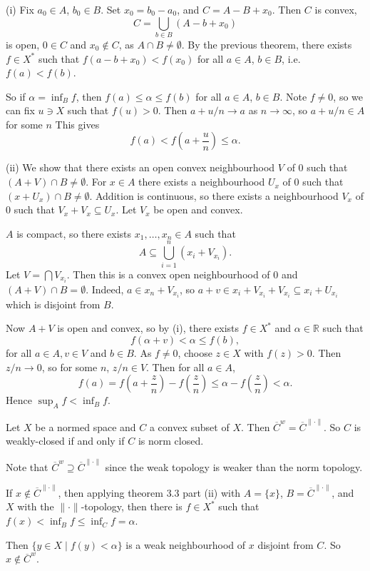 \documentclass[12pt]{article}
\begin{document}
\begin{proofbox}
	

	(i) Fix $a_0 \in A$, $b_0 \in B$. Set $x_0 = b_0 - a_0$, and $C = A - B + x_0$. Then $C$ is convex,
	\[
	C = \bigcup_{b \in B}(A - b + x_0)
	\]
	is open, $0 \in C$ and $x_0 \not \in C$, as $A \cap B \neq \emptyset$. By the previous theorem, there exists $f \in X^{\ast}$ such that $f(a - b + x_0) < f(x_0)$ for all $a \in A$, $b \in B$, i.e. $f(a) < f(b)$.

	So if $\alpha = \inf_B f$, then $f(a) \leq \alpha \leq f(b)$ for all $a \in A$, $b \in B$. Note $f \neq 0$, so we can fix $u \ni X$ such that $f(u) > 0$. Then $a + u/n \to a$ as $n \to \infty$, so $a + u/n \in A$ for some $n$ This gives
	\[
	f(a) < f\left(a + \frac{u}{n} \right) \leq \alpha.
	\]

	(ii) We show that there exists an open convex neighbourhood $V$ of $0$ such that $(A + V) \cap B \neq \emptyset$. For $x \in A$ there exists a neighbourhood $U_x$ of $0$ such that $(x + U_x) \cap B \neq \emptyset$. Addition is continuous, so there exists a neighbourhood $V_x$ of $0$ such that $V_x + V_x \subseteq U_x$. Let $V_x$ be open and convex.

	$A$ is compact, so there exists $x_1, \ldots, x_n \in A$ such that
	\[
	A \subseteq \bigcup_{i = 1}^{n}(x_i + V_{x_i}).
	\]
	Let $V = \bigcap V_{x_i}$. Then this is a convex open neighbourhood of $0$ and $(A + V) \cap B = \emptyset$. Indeed, $a \in x_n + V_{x_i}$, so $a + v \in x_i + V_{x_i} + V_{x_i} \subseteq x_i + U_{x_i}$ which is disjoint from $B$.

	Now $A + V$ is open and convex, so by (i), there exists $f \in X^{\ast}$ and $\alpha \in \mathbb{R}$ such that
	\[
	f(\alpha + v) < \alpha \leq f(b),
	\]
	for all $a \in A, v \in V$ and $b \in B$. As $f \neq 0$, choose $z \in X$ with $f(z) > 0$. Then $z/n \to 0$, so for some $n$, $z/n \in V$. Then for all $a \in A$,
	\[
	f(a) = f\left(a + \frac{z}{n} \right) - f\left( \frac{z}{n} \right) \leq \alpha - f\left( \frac{z}{n} \right) < \alpha.
	\]
	Hence $\sup_A f < \inf_B f$.
\end{proofbox}

\begin{theorem}
	Let $X$ be a normed space and $C$ a convex subset of $X$. Then $\overline{C}^w = \overline{C}^{\|\cdot\|}$. So $C$ is weakly-closed if and only if $C$ is norm closed.
\end{theorem}

\begin{proofbox}
	Note that $\overline{C}^w \supseteq \overline{C}^{\|\cdot\|}$ since the weak topology is weaker than the norm topology.

	If $x \not \in \overline{C}^{\|\cdot\|}$, then applying theorem 3.3 part (ii) with $A = \{x\}$, $B = \overline{C}^{\|\cdot\|}$, and $X$ with the $\|\cdot\|$-topology, then there is $f \in X^{\ast}$ such that $f(x) < \inf_B f \leq \inf_C f = \alpha$.

	Then $\{y \in X \mid f(y) < \alpha\}$ is a weak neighbourhood of $x$ disjoint from $C$. So $x \not \in \overline{C}^w$.
\end{proofbox}
\end{document}

